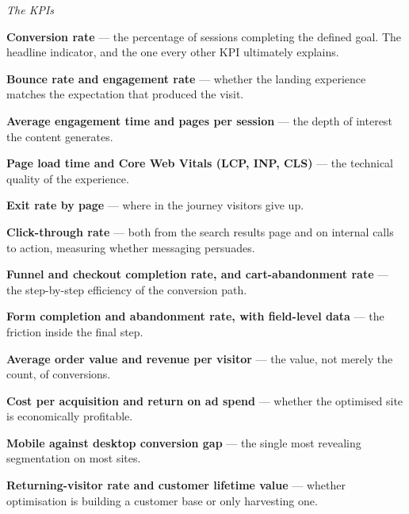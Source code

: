 \begin{qlist}
\textit{The KPIs}
\begin{apts}
\item \textbf{Conversion rate} --- the percentage of sessions completing the
      defined goal. The headline indicator, and the one every other KPI
      ultimately explains.
\item \textbf{Bounce rate and engagement rate} --- whether the landing
      experience matches the expectation that produced the visit.
\item \textbf{Average engagement time and pages per session} --- the depth of
      interest the content generates.
\item \textbf{Page load time and Core Web Vitals (LCP, INP, CLS)} --- the
      technical quality of the experience.
\item \textbf{Exit rate by page} --- where in the journey visitors give up.
\item \textbf{Click-through rate} --- both from the search results page and on
      internal calls to action, measuring whether messaging persuades.
\item \textbf{Funnel and checkout completion rate, and cart-abandonment rate}
      --- the step-by-step efficiency of the conversion path.
\item \textbf{Form completion and abandonment rate, with field-level data} ---
      the friction inside the final step.
\item \textbf{Average order value and revenue per visitor} --- the value, not
      merely the count, of conversions.
\item \textbf{Cost per acquisition and return on ad spend} --- whether the
      optimised site is economically profitable.
\item \textbf{Mobile against desktop conversion gap} --- the single most
      revealing segmentation on most sites.
\item \textbf{Returning-visitor rate and customer lifetime value} --- whether
      optimisation is building a customer base or only harvesting one.
\end{apts}


\end{qlist}
